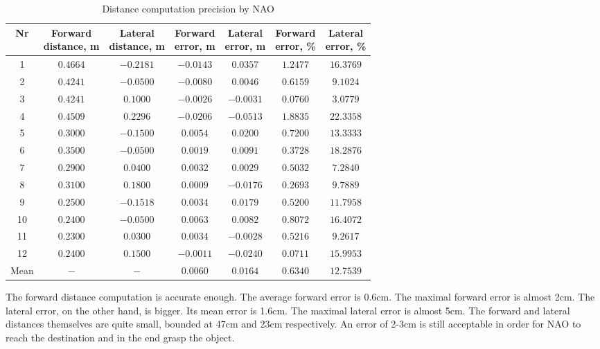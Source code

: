 \begin{table}[t!]
\centering
\caption{Distance computation precision by NAO}
{
\renewcommand{\arraystretch}{2}
\begin{tabular}{ c|c|c|c|c|c|c }
\hline           
 Nr & \pbox{4cm}{Forward \\distance, m} &\pbox{5cm}{Lateral \\distance, m} &  \pbox{7cm}{Forward \\error, m} & \pbox{7cm}{Lateral \\error, m} &
  \pbox{7cm}{Forward \\error, \%} & \pbox{7cm}{Lateral \\error, \%} \\ \hline \hline
          1 & \( 0.4664 \) & \( -0.2181 \) & \( -0.0143 \) & \( 0.0357 \) & \( 1.2477 \) & \( 16.3769 \) \\ 
          2 & \( 0.4241 \) & \( -0.0500 \) & \( -0.0080 \) & \( 0.0046 \) & \( 0.6159 \) & \( 9.1024 \)  \\ 
          3 & \( 0.4241 \) & \( 0.1000 \) & \( -0.0026 \) & \( -0.0031 \) & \( 0.0760 \) & \( 3.0779 \) \\ 
          4 & \( 0.4509 \) & \( 0.2296 \) & \( -0.0206 \) & \( -0.0513 \) & \( 1.8835 \) & \( 22.3358 \) \\ 
          5 & \( 0.3000 \) & \( -0.1500 \) & \( 0.0054 \) & \( 0.0200 \) & \( 0.7200 \) & \( 13.3333 \) \\ 
          6 & \( 0.3500 \) & \( -0.0500 \) & \( 0.0019 \) & \( 0.0091 \) & \( 0.3728 \) & \( 18.2876 \) \\ 
          7 & \( 0.2900 \) & \( 0.0400 \) & \( 0.0032 \) & \( 0.0029 \) & \( 0.5032 \) & \( 7.2840 \) \\ 
          8 & \( 0.3100 \) & \( 0.1800 \) & \( 0.0009 \) & \( -0.0176 \) & \( 0.2693 \) & \( 9.7889 \) \\ 
          9 & \( 0.2500 \) & \( -0.1518 \) & \( 0.0034 \) & \( 0.0179 \) & \( 0.5200 \) & \( 11.7958 \) \\ 
          10 & \( 0.2400 \) & \( -0.0500 \) & \( 0.0063 \) & \( 0.0082 \) & \( 0.8072 \) & \( 16.4072 \) \\ 
          11 & \( 0.2300 \) & \( 0.0300 \) & \( 0.0034 \) & \( -0.0028 \) & \( 0.5216 \) & \( 9.2617 \) \\ 
          12 & \( 0.2400 \) & \( 0.1500 \) & \( -0.0011 \) & \( -0.0240 \) & \( 0.0711 \) & \( 15.9953 \) \\ \hline
          Mean & \( - \)  & \( - \) & \( 0.0060 \) & \( 0.0164 \) & \( 0.6340 \) & \( 12.7539 \) \\ \hline 
\end{tabular}
}
\label{tab:items}
\end{table}
      The forward distance computation is accurate enough. The average forward error is 0.6cm. The maximal forward error is almost 2cm. The lateral error, on the other hand, is bigger. Its mean error is 1.6cm. The maximal lateral error is almost 5cm. The forward and lateral distances themselves are quite small, bounded at 47cm and 23cm respectively. An error of 2-3cm is still acceptable in order for NAO to reach the destination and in the end grasp the object.


